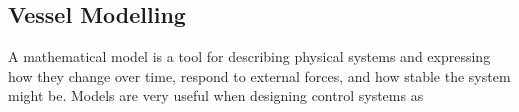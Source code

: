 \subsection{Vessel Modelling}
A mathematical model is a tool for describing physical systems and expressing how they change over time, respond to external forces, and how stable the system might be. Models are very useful when designing control systems as
